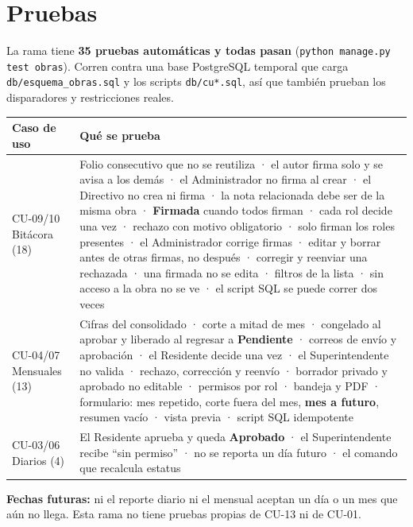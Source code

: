 \documentclass[11pt,letterpaper]{article}
\newcommand{\cod}[1]{\texttt{\small #1}}
\newcommand{\estatus}[1]{{\sffamily\small\bfseries #1}}
\begin{document}
\section{Pruebas}
La rama tiene \textbf{35 pruebas automáticas y todas pasan} (\cod{python manage.py test obras}). Corren contra una base PostgreSQL temporal que carga \cod{db/esquema\_obras.sql} y los scripts \cod{db/cu*.sql}, así que también prueban los disparadores y restricciones reales.

\begin{center}\small{}
\begin{tabularx}{\linewidth}{@{}>{\raggedright\arraybackslash}p{3.2cm}L@{}}
\toprule\sffamily\bfseries Caso de uso & \sffamily\bfseries Qué se prueba\\\midrule
CU-09/10 Bitácora (18) &
Folio consecutivo que no se reutiliza · el autor firma solo y se avisa a los demás · el Administrador no firma al crear · el Directivo no crea ni firma · la nota relacionada debe ser de la misma obra · \estatus{Firmada} cuando todos firman · cada rol decide una vez · rechazo con motivo obligatorio · solo firman los roles presentes · el Administrador corrige firmas · editar y borrar antes de otras firmas, no después · corregir y reenviar una rechazada · una firmada no se edita · filtros de la lista · sin acceso a la obra no se ve · el script SQL se puede correr dos veces\\
CU-04/07 Mensuales (13) &
Cifras del consolidado · corte a mitad de mes · congelado al aprobar y liberado al regresar a \estatus{Pendiente} · correos de envío y aprobación · el Residente decide una vez · el Superintendente no valida · rechazo, corrección y reenvío · borrador privado y aprobado no editable · permisos por rol · bandeja y PDF · formulario: mes repetido, corte fuera del mes, \textbf{mes a futuro}, resumen vacío · vista previa · script SQL idempotente\\
CU-03/06 Diarios (4) &
El Residente aprueba y queda \estatus{Aprobado} · el Superintendente recibe \enquote{sin permiso} · no se reporta un día futuro · el comando que recalcula estatus\\
\bottomrule\end{tabularx}\end{center}

\begin{ojo}
\textbf{Fechas futuras:} ni el reporte diario ni el mensual aceptan un día o un mes que aún no llega. Esta rama no tiene pruebas propias de CU-13 ni de CU-01.
\end{ojo}
\end{document}
